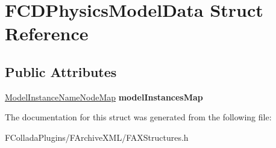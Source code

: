 \hypertarget{structFCDPhysicsModelData}{
\section{FCDPhysicsModelData Struct Reference}
\label{structFCDPhysicsModelData}
}
\subsection*{Public Attributes}
\begin{DoxyCompactItemize}
\item 
\hypertarget{structFCDPhysicsModelData_abf8f83e227a7365c8cf06f771ac91e83}{
\hyperlink{classfm_1_1map}{ModelInstanceNameNodeMap} {\bfseries modelInstancesMap}}
\label{structFCDPhysicsModelData_abf8f83e227a7365c8cf06f771ac91e83}

\end{DoxyCompactItemize}


The documentation for this struct was generated from the following file:\begin{DoxyCompactItemize}
\item 
FColladaPlugins/FArchiveXML/FAXStructures.h\end{DoxyCompactItemize}

